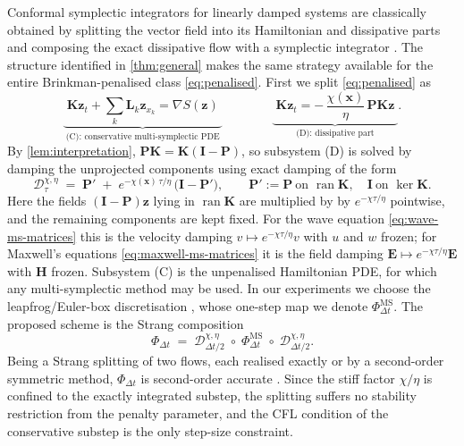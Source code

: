 \documentclass[11pt]{article}
\theoremstyle{definition}
\theoremstyle{remark}
\newcommand{\bz}{\bm{z}}
\newcommand{\bx}{\bm{x}}
\newcommand{\bE}{\bm{E}}
\newcommand{\bH}{\bm{H}}
\newcommand{\bK}{\bm{K}}
\newcommand{\bL}{\bm{L}}
\newcommand{\bP}{\bm{P}}
\newcommand{\bI}{\bm{I}}
\newcommand{\chixx}{\chi(\bx)}
\newcommand{\Do}{\mathcal{D}}
\DeclareMathOperator{\ran}{ran}
\begin{document}
Conformal symplectic integrators for linearly damped systems are
classically obtained by splitting the vector field into its
Hamiltonian and dissipative parts and composing the exact dissipative
flow with a symplectic integrator
\cite{mclachlan2001conformal,mclachlan2002splitting,bhatt2016conformal}.
The structure identified in \cref{thm:general} makes the same strategy
available for the entire Brinkman-penalised class \eqref{eq:penalised}.  First we split
\eqref{eq:penalised} as
\begin{equation}
\label{eq:splitting}
\underbrace{\;\bK\bz_t + \sum_{k}\bL_k\bz_{x_k} = \nabla S(\bz)\;}
_{\text{(C): conservative multi-symplectic PDE}}
\qquad\qquad
\underbrace{\;\bK\bz_t = -\,\frac{\chixx}{\eta}\,\bP\bK\bz\;}
_{\text{(D): dissipative part}} .
\end{equation}
By \cref{lem:interpretation}, $\bP\bK=\bK(\bI-\bP)$, so subsystem (D)
is solved by damping the unprojected components using exact damping of the form
\begin{equation}
\label{eq:dissipation-semigroup}
\Do^{\chi,\eta}_{\tau}
\;=\;
\bP' \;+\; e^{-\chixx\,\tau/\eta}\,\bigl(\bI-\bP'\bigr),
\qquad
\bP' := \bP \ \text{on } \ran\bK,
\quad \bI \ \text{on } \ker\bK.
\end{equation}
Here the fields $(\bI-\bP)\bz$ lying in $\ran\bK$ are multiplied by
by $e^{-\chi\tau/\eta}$ pointwise, and the remaining components are kept fixed.
For the wave equation \eqref{eq:wave-ms-matrices} this is the velocity
damping $v\mapsto e^{-\chi\tau/\eta}v$ with $u$ and $w$ frozen; for
Maxwell's equations \eqref{eq:maxwell-ms-matrices} it is the field
damping $\bE\mapsto e^{-\chi\tau/\eta}\bE$ with $\bH$ frozen.
Subsystem (C) is the unpenalised Hamiltonian PDE, for which any
multi-symplectic method may be used. In our experiments we choose the
leapfrog/Euler-box discretisation
\cite{bridges2001multi,moore2003backward}, whose one-step map we
denote $\Phi^{\mathrm{MS}}_{\Delta t}$.  The proposed scheme is the
Strang composition
\begin{equation}
\label{eq:scheme}
\Phi_{\Delta t}
\;=\;
\Do^{\chi,\eta}_{\Delta t/2}
\;\circ\;
\Phi^{\mathrm{MS}}_{\Delta t}
\;\circ\;
\Do^{\chi,\eta}_{\Delta t/2}.
\end{equation}
Being a Strang splitting of two flows, each realised exactly or by a
second-order symmetric method, $\Phi_{\Delta t}$ is second-order
accurate \cite{strang1968construction,mclachlan2002splitting}. Since
the stiff factor $\chi/\eta$ is confined to the exactly integrated
substep, the splitting suffers no stability restriction from the
penalty parameter, and the CFL condition of the conservative substep
is the only step-size constraint.
\end{document}
